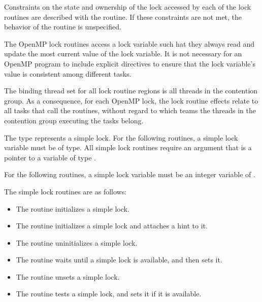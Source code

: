 Constraints on the state and ownership of the lock accessed by each of the lock routines 
are described with the routine. If these constraints are not met, the behavior of the 
routine is unspecified. 

The OpenMP lock routines access a lock variable such hat they always read 
and update the most current value of the lock variable. It is not necessary for an 
OpenMP program to include explicit  directives to ensure that the lock variable's 
value is consistent among different tasks. 

\binding
The binding thread set for all lock routine regions is all threads in the contention group. 
As a consequence, for each OpenMP lock, the lock routine effects relate to all tasks that 
call the routines, without regard to which teams the threads in the contention group 
executing the tasks belong.


\ccppspecificstart
The type  represents a simple lock. For the 
following routines, a simple lock variable must be of  type. All simple 
lock routines require an argument that is a pointer to a variable of type .
\ccppspecificend

\fortranspecificstart
For the following routines, a simple lock variable must be an integer variable of 
.
\fortranspecificend

The simple lock routines are as follows:

\begin{itemize}
\item The  routine initializes a simple lock.

\item The  routine initializes a simple lock and attaches a hint to it.

\item The  routine uninitializes a simple lock.

\item The  routine waits until a simple lock is available, and then sets it.

\item The  routine unsets a simple lock.

\item The  routine tests a simple lock, and sets it if it is available.
\end{itemize}

